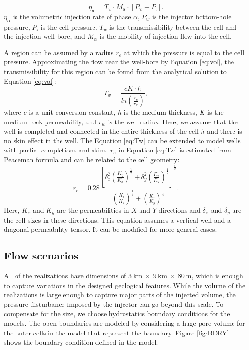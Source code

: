 \begin{equation}
 \eta_{\alpha}=T_w\cdot M_{\alpha}\cdot [P_w-P_{\mbox{i}}].
 \label{eq:WFLW}
\end{equation} $\eta_{\alpha}$ is the volumetric injection rate of phase
$\alpha$, $P_w$ is the injector bottom-hole pressure, $P_{\mbox{i}}$ is the
cell pressure, $T_{w}$ is the transmissibility between the cell and the
injection well-bore, and $M_\alpha$ is the mobility of injection flow into the
cell. 

A region can be assumed by a radius $r_e$ at which the
pressure is equal to the cell pressure. Approximating the flow near the
well-bore by Equation \ref{eq:vol}, the transmissibility for this region can be
found from the analytical solution to Equation \ref{eq:vol}:
\begin{equation}
 T_w=\frac{c K \cdot h}{ln(\frac{r_e}{r_w})},
 \label{eq:Tw}
\end{equation} where $c$ is a unit conversion constant, $h$ is the medium
thickness, $K$ is the medium rock permeability, and $r_{w}$ is the well radius.
Here, we assume that the well is completed and connected in the entire thickness
of the cell $h$ and there is no skin effect in the well. The Equation
\ref{eq:Tw} can be extended to model wells with partial completions and skins.
$r_{e}$ in Equation \ref{eq:Tw} is estimated from Peaceman formula and can be
related to the cell geometry:
\begin{equation}
r_e =  0.28\frac{\left[
\delta_x^2(\frac{K_y}{K_x})^{\frac{1}{2}}+\delta_y^2(\frac{K_x}{K_y})^{\frac{1}{
2}}\right]^{\frac{1}{2}}}{(\frac{K_y}{K_x})^{\frac{1}{4}}+(\frac{K_x}{K_y})^{
\frac{1}{4}}}.
\label{eq:rinf} 
\end{equation} Here, $K_x$ and $K_y$ are the permeabilities in $X$ and $Y$
directions and $\delta_x$ and $\delta_y$ are the cell sizes in these directions.
This equation assumes a vertical well and a diagonal permeability tensor. It can
be modified for more general cases.

\subsection{Flow scenarios}

All of the realizations have dimensions of
$3~\mbox{km}~\times~9~\mbox{km}~\times~80~\mbox{m}$, which is enough to capture
variations in the designed geological features. While the volume of the
realizations is large enough to capture major parts of the injected volume, the
pressure disturbance imposed by the injector can go beyond this
scale. To compensate for the size, we choose hydrostatics boundary conditions
for the models. The open boundaries are modeled by considering a huge pore
volume for the outer cells in the model that represent the boundary. Figure
\ref{fig:BDRY} shows the boundary condition defined in the model.

